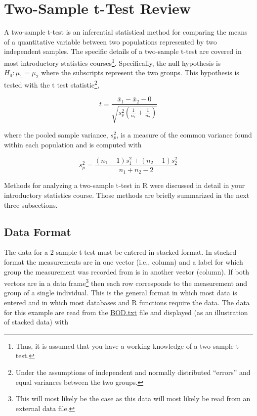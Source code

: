 \documentclass[10pt,openany]{book}\usepackage[]{graphicx}\usepackage[]{color}
\begin{document}
\section{Two-Sample t-Test Review} \label{sect:2tTest}
A two-sample t-test is an inferential statistical method for comparing the means of a quantitative variable between two populations represented by two independent samples.  The specific details of a two-sample t-test are covered in most introductory statistics courses\footnote{Thus, it is assumed that you have a working knowledge of a two-sample t-test.}.  Specifically, the null hypothesis is $H_{0}:\mu_{1}=\mu_{2}$ where the subscripts represent the two groups.  This hypothesis is tested with the t test statistic\footnote{Under the assumptions of independent and normally distributed ``errors'' and equal variances between the two groups.},

\begin{equation} \label{eqn:2tTestStat}
   t=\frac{\bar{x}_{1}-\bar{x}_{2}-0}{\sqrt{s_{p}^{2}\left(\frac{1}{n_{1}}+\frac{1}{n_{2}} \right)}}
\end{equation}

where the pooled sample variance, $s_{p}^{2}$, is a measure of the common variance found within each population and is computed with

\[ s_{p}^{2}=\frac{(n_{1}-1)s_{1}^{2}+(n_{2}-1)s_{2}^{2}}{n_{1}+n_{2}-2} \]

Methods for analyzing a two-sample t-test in R were discussed in detail in your introductory statistics course.  Those methods are briefly summarized in the next three subsections.

\subsection{Data Format} \label{sect:DataStacked}
The data for a 2-sample t-test must be entered in stacked format.  In stacked format the measurements are in one vector (i.e., column) and a label for which group the measurement was recorded from is in another vector (column).  If both vectors are in a data frame\footnote{This will most likely be the case as this data will most likely be read from an external data file.} then each row corresponds to the measurement and group of a single individual.  This is the general format in which most data is entered and in which most databases and R functions require the data.  The data for this example are read from the \href{https://sites.google.com/site/ncstats/data/BOD.txt}{BOD.txt} file and displayed (as an illustration of stacked data) with
\end{document}
